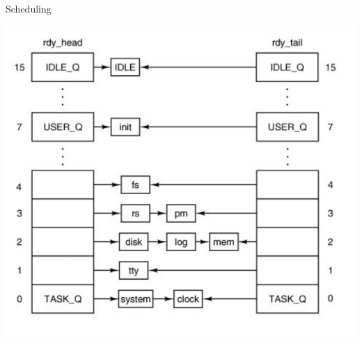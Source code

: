 \documentclass[10pt]{beamer}
\begin{document}
\begin{frame}[allowframebreaks]{Scheduling}
\begin{center}
    \includegraphics[keepaspectratio, width=\textwidth, height=\textheight-2\baselineskip-2\baselineskip]{img/011_sched_.png} \\
 \end{center}
\end{frame}
\end{document}
